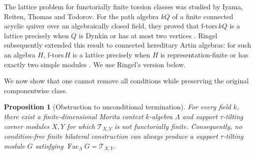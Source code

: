 \documentclass[11pt,reqno]{amsart}
\newtheorem{proposition}[theorem]{Proposition}
\theoremstyle{definition}
\theoremstyle{remark}
\newcommand{\Fac}{\operatorname{Fac}}
\numberwithin{equation}{section}
\begin{document}
The lattice problem for functorially finite torsion classes was studied by
Iyama, Reiten, Thomas and Todorov.  For the path algebra $kQ$ of a finite
connected acyclic quiver over an algebraically closed field, they proved that
$\mathrm{f\text{-}tors}\,kQ$ is a lattice precisely when $Q$ is Dynkin or has
at most two vertices \cite[Theorem~1.3]{IRTT}.  Ringel subsequently extended
this result to connected hereditary Artin algebras: for such an algebra $H$,
$\mathrm{f\text{-}tors}\,H$ is a lattice precisely when $H$ is
representation-finite or has exactly two simple modules
\cite[Theorem]{Ringel}.  We use Ringel's version below.

We now show that one cannot remove all conditions while preserving the
original componentwise class.

\begin{proposition}[Obstruction to unconditional termination]
\label{prop:obstruction}
For every field $k$, there exist a finite-dimensional Morita context
$k$-algebra $\Lambda$ and support $\tau$-tilting corner modules $X,Y$ for
which
$\mathcal T_{X,Y}$ is not functorially finite.  Consequently, no
condition-free finite bilateral construction can always produce a support
$\tau$-tilting module $G$ satisfying
$\Fac_\Lambda G=\mathcal T_{X,Y}$.
\end{proposition}
\end{document}
